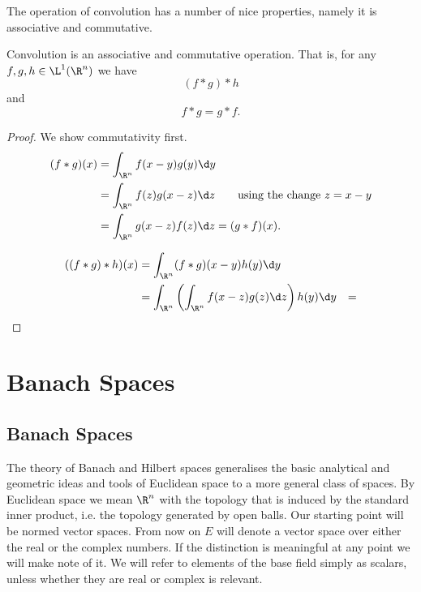 \documentclass[12pt,oneside]{book}
\begin{document}
The operation of convolution has a number of nice properties, namely it is associative and
commutative.
\begin{proposition}
	Convolution is an associative and commutative operation. That is, for any \( f, g, h \in
	\L^1(\R^n) \) we have
	\begin{equation*}
		(f \ast g) \ast h
	\end{equation*}
	and
	\begin{equation*}
		f \ast g = g \ast f.
	\end{equation*}
\end{proposition}
\begin{proof}
	We show commutativity first.
	\begin{align*}
		(f \ast g)(x) & = \int_{\R^n} f(x - y)g(y) \d y \\
									& = \int_{\R^n} f(z)g(x - z) \d z	\tag*{using the change \( z = x -y
									\)} \\
									& = \int_{\R^n} g(x - z)f(z) \d z = (g \ast f)(x).
	\end{align*}

	\begin{align*}
		((f \ast g) \ast h)(x) & = \int_{\R^n} (f \ast g)(x - y) h(y) \d y \\
													 & = \int_{\R^n} \left(\int_{\R^n} f(x - z)g(z) \d z\right) h(y) \d y
													 & = 
	\end{align*}

\end{proof}

\part{Banach Spaces}
\chapter{Banach Spaces}
The theory of Banach and Hilbert spaces generalises the basic analytical and geometric
ideas and tools of Euclidean space to a more general class of spaces. By Euclidean space
we mean \( \R^n \) with the topology that is induced by the standard inner product, i.e.
the topology generated by open balls. Our starting point will be normed vector spaces.
From now on \( E \) will denote a vector space over either the real or the complex
numbers. If the distinction is meaningful at any point we will make note of it. We will
refer to elements of the base field simply as scalars, unless whether they are real or
complex is relevant.
\end{document}
